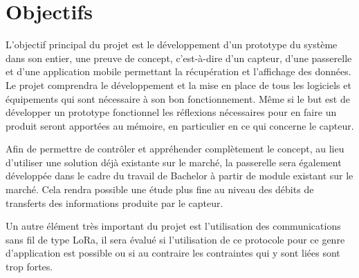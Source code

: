 \chapter{Objectifs}

L’objectif principal du projet est le développement d’un prototype du système dans son entier, une preuve de concept, c’est-à-dire d’un capteur, d’une passerelle et d’une application mobile permettant la récupération et l’affichage des données. Le projet comprendra le développement et la mise en place de tous les logiciels et équipements qui sont nécessaire à son bon fonctionnement. Même si le but est de développer un prototype fonctionnel les réflexions nécessaires pour en faire un produit seront apportées au mémoire, en particulier en ce qui concerne le capteur.

Afin de permettre de contrôler et appréhender complètement le concept, au lieu d’utiliser une solution déjà existante sur le marché, la passerelle sera également développée dans le cadre du travail de Bachelor à partir de module existant sur le marché. Cela rendra possible une étude plus fine au niveau des débits de transferts des informations produite par le capteur.

Un autre élément très important du projet est l’utilisation des communications sans fil de type LoRa, il sera évalué si l’utilisation de ce protocole pour ce genre d’application est possible ou si au contraire les contraintes qui y sont liées sont trop fortes.
